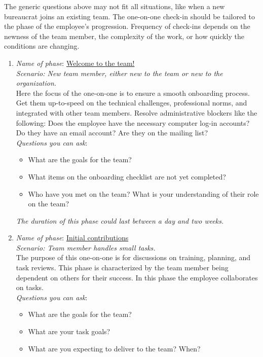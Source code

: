 The generic questions above may not fit all situations, like when a new bureaucrat joins an existing team. 
The one-on-one check-in should be tailored to the phase of the employee's progression. Frequency of check-ins depends on the newness of the team member, the complexity of the work, or how quickly the conditions are changing.
\begin{enumerate}
    \item \textit{Name of phase}: \underline{Welcome to the team!}\\
    \textit{Scenario: New team member, either new to the team or new to the organization. }\\
    Here the focus of the one-on-one is to ensure a smooth onboarding process. Get them up-to-speed on the technical challenges, professional norms, and integrated with other team members. Resolve administrative blockers like the following: Does the employee have the necessary computer log-in accounts? Do they have an email account? Are they on the mailing list? \\
    \textit{Questions you can ask}:
    \begin{itemize}
        \item What are the goals for the team?
        \item What items on the onboarding checklist are not yet completed?
        \item Who have you met on the team? What is your understanding of their role on the team?
    \end{itemize}
\textit{The duration of this phase could last between a day and two weeks.}
    \item \textit{Name of phase}: \underline{Initial contributions}\\
    \textit{Scenario: Team member handles small tasks. }\\
    The purpose of this one-on-one is for discussions on training, planning, and task reviews. This phase is characterized by the team member being dependent on others for their success. In this phase the employee collaborates on tasks.\\
    \textit{Questions you can ask}:
    \begin{itemize}
        \item What are the goals for the team?
        \item What are your task goals?
        \item What are you expecting to deliver to the team? When? 

\end{itemize}
\end{enumerate}
